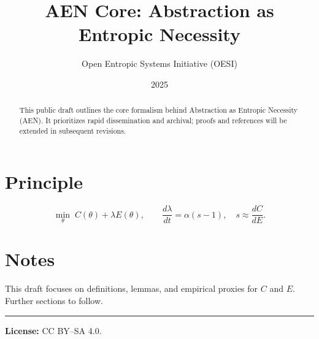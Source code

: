 \documentclass[11pt]{article}
\title{\textbf{AEN Core: Abstraction as Entropic Necessity}}
\author{Open Entropic Systems Initiative (OESI)}
\date{2025}
\begin{document}
\maketitle
\begin{abstract}\noindent
This public draft outlines the core formalism behind Abstraction as Entropic Necessity (AEN). It prioritizes rapid dissemination and archival; proofs and references will be extended in subsequent revisions.
\end{abstract}
\section{Principle}\vspace{-0.25em}
\begin{equation}
\min_{\theta}\; C(\theta) + \lambda E(\theta),\qquad \frac{d\lambda}{dt}=\alpha(s-1),\quad s\approx \frac{dC}{dE}.
\end{equation}
\section{Notes} This draft focuses on definitions, lemmas, and empirical proxies for $C$ and $E$. Further sections to follow.
\bigskip\hrule\smallskip\footnotesize
\noindent \textbf{License:} CC BY--SA 4.0.
\end{document}
